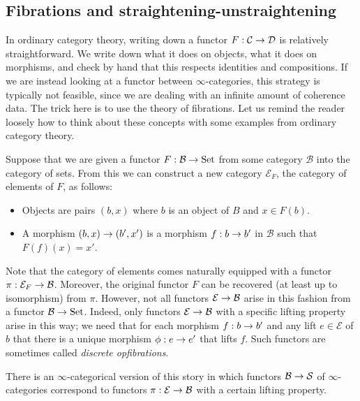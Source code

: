 \documentclass[10pt]{amsart}
\numberwithin{equation}{section}
\theoremstyle{definition}
\DeclareMathOperator{\Set}{Set}
\newcommand{\cC}{\mathcal{C}}
\newcommand{\cS}{\mathcal{S}}
\renewcommand{\to}{\mathchoice{\longrightarrow}{\rightarrow}{}{}}
\begin{document}
	\subsection{Fibrations and straightening-unstraightening}\label{subsec:fibrations_and_straightening}

	In ordinary category theory, writing down a functor $F : \cC \to \mathcal{D}$ is relatively straightforward.
	We write down what it does on objects, what it does on morphisms, and check by hand that this respects identities and compositions.
	If we are instead looking at a functor between $\infty$-categories, this strategy is typically not feasible, since we are dealing with an infinite amount of coherence data.
	The trick here is to use the theory of fibrations.
	Let us remind the reader loosely how to think about these concepts with some examples from ordinary category theory.

	Suppose that we are given a functor $F : \mathcal{B} \to \Set$ from some category $\mathcal{B}$ into the category of sets.
	From this we can construct a new category $\mathcal{E}_{F}$, the category of elements of $F$, as follows:
	\begin{itemize}
		\item Objects are pairs $(b,x)$ where $b$ is an object of $B$ and $x \in F(b)$.
		\item A morphism $(b,x) \to (b',x')$ is a morphism $f : b \to b'$ in $\mathcal{B}$ such that $F(f)(x) = x'$.
	\end{itemize}
	Note that the category of elements comes naturally equipped with a functor $\pi : \mathcal{E}_{F} \to \mathcal{B}$.
	Moreover, the original functor $F$ can be recovered (at least up to isomorphism) from $\pi$.
	However, not all functors $\mathcal{E} \to \mathcal{B}$ arise in this fashion from a functor $\mathcal{B} \to \Set$.
	Indeed, only functors $\mathcal{E} \to \mathcal{B}$ with a specific lifting property arise in this way; we need that for each morphism $f : b \to b'$ and any lift $e \in \mathcal{E}$ of $b$ that there is a unique morphism $\phi : e \to e'$ that lifts $f$.
	Such functors are sometimes called \emph{discrete opfibrations}.

	There is an $\infty$-categorical version of this story in which functors $\mathcal{B} \to \cS$ of $\infty$-categories correspond to functors $\pi : \mathcal{E} \to \mathcal{B}$ with a certain lifting property.
\end{document}
